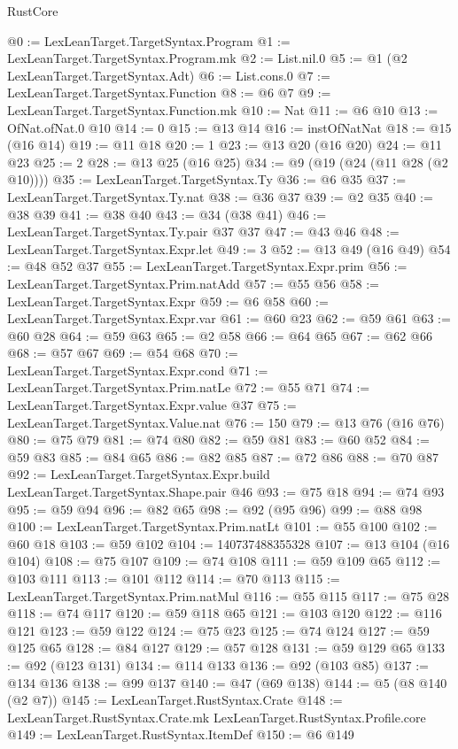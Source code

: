 \begin{lexlean}{RustCore}
\begin{coremodule}
@0 := LexLeanTarget.TargetSyntax.Program
@1 := LexLeanTarget.TargetSyntax.Program.mk
@2 := List.nil.{0}
@5 := @1 (@2 LexLeanTarget.TargetSyntax.Adt)
@6 := List.cons.{0}
@7 := LexLeanTarget.TargetSyntax.Function
@8 := @6 @7
@9 := LexLeanTarget.TargetSyntax.Function.mk
@10 := Nat
@11 := @6 @10
@13 := OfNat.ofNat.{0} @10
@14 := 0
@15 := @13 @14
@16 := instOfNatNat
@18 := @15 (@16 @14)
@19 := @11 @18
@20 := 1
@23 := @13 @20 (@16 @20)
@24 := @11 @23
@25 := 2
@28 := @13 @25 (@16 @25)
@34 := @9 (@19 (@24 (@11 @28 (@2 @10))))
@35 := LexLeanTarget.TargetSyntax.Ty
@36 := @6 @35
@37 := LexLeanTarget.TargetSyntax.Ty.nat
@38 := @36 @37
@39 := @2 @35
@40 := @38 @39
@41 := @38 @40
@43 := @34 (@38 @41)
@46 := LexLeanTarget.TargetSyntax.Ty.pair @37 @37
@47 := @43 @46
@48 := LexLeanTarget.TargetSyntax.Expr.let
@49 := 3
@52 := @13 @49 (@16 @49)
@54 := @48 @52 @37
@55 := LexLeanTarget.TargetSyntax.Expr.prim
@56 := LexLeanTarget.TargetSyntax.Prim.natAdd
@57 := @55 @56
@58 := LexLeanTarget.TargetSyntax.Expr
@59 := @6 @58
@60 := LexLeanTarget.TargetSyntax.Expr.var
@61 := @60 @23
@62 := @59 @61
@63 := @60 @28
@64 := @59 @63
@65 := @2 @58
@66 := @64 @65
@67 := @62 @66
@68 := @57 @67
@69 := @54 @68
@70 := LexLeanTarget.TargetSyntax.Expr.cond
@71 := LexLeanTarget.TargetSyntax.Prim.natLe
@72 := @55 @71
@74 := LexLeanTarget.TargetSyntax.Expr.value @37
@75 := LexLeanTarget.TargetSyntax.Value.nat
@76 := 150
@79 := @13 @76 (@16 @76)
@80 := @75 @79
@81 := @74 @80
@82 := @59 @81
@83 := @60 @52
@84 := @59 @83
@85 := @84 @65
@86 := @82 @85
@87 := @72 @86
@88 := @70 @87
@92 := LexLeanTarget.TargetSyntax.Expr.build LexLeanTarget.TargetSyntax.Shape.pair @46
@93 := @75 @18
@94 := @74 @93
@95 := @59 @94
@96 := @82 @65
@98 := @92 (@95 @96)
@99 := @88 @98
@100 := LexLeanTarget.TargetSyntax.Prim.natLt
@101 := @55 @100
@102 := @60 @18
@103 := @59 @102
@104 := 140737488355328
@107 := @13 @104 (@16 @104)
@108 := @75 @107
@109 := @74 @108
@111 := @59 @109 @65
@112 := @103 @111
@113 := @101 @112
@114 := @70 @113
@115 := LexLeanTarget.TargetSyntax.Prim.natMul
@116 := @55 @115
@117 := @75 @28
@118 := @74 @117
@120 := @59 @118 @65
@121 := @103 @120
@122 := @116 @121
@123 := @59 @122
@124 := @75 @23
@125 := @74 @124
@127 := @59 @125 @65
@128 := @84 @127
@129 := @57 @128
@131 := @59 @129 @65
@133 := @92 (@123 @131)
@134 := @114 @133
@136 := @92 (@103 @85)
@137 := @134 @136
@138 := @99 @137
@140 := @47 (@69 @138)
@144 := @5 (@8 @140 (@2 @7))
@145 := LexLeanTarget.RustSyntax.Crate
@148 := LexLeanTarget.RustSyntax.Crate.mk LexLeanTarget.RustSyntax.Profile.core
@149 := LexLeanTarget.RustSyntax.ItemDef
@150 := @6 @149

\end{coremodule}
\end{lexlean}

